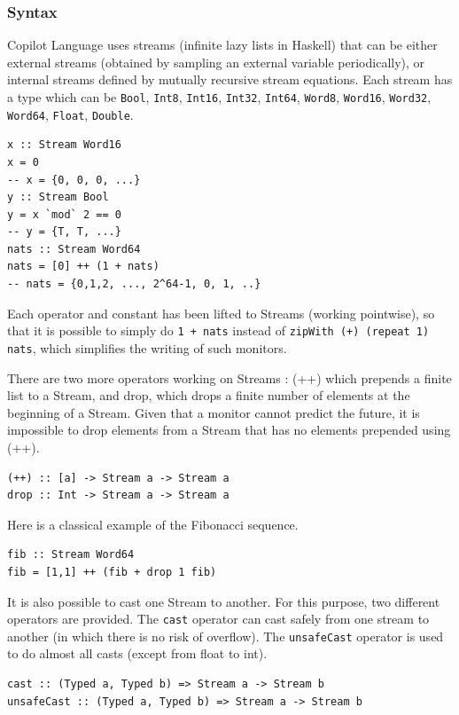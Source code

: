 \documentclass[a4paper,11pt,final]{article}
\begin{document}
	\subsubsection{Syntax}
	Copilot Language uses streams (infinite lazy lists in Haskell) that can be either external streams (obtained by sampling an external variable periodically), or internal streams defined by mutually recursive stream equations. Each stream has a type which can be \texttt{Bool}, \texttt{Int8}, \texttt{Int16}, \texttt{Int32}, \texttt{Int64}, \texttt{Word8}, \texttt{Word16}, \texttt{Word32}, \texttt{Word64}, \texttt{Float}, \texttt{Double}.
	
\begin{verbatim}
x :: Stream Word16
x = 0
-- x = {0, 0, 0, ...}
y :: Stream Bool
y = x `mod` 2 == 0
-- y = {T, T, ...}
nats :: Stream Word64
nats = [0] ++ (1 + nats)
-- nats = {0,1,2, ..., 2^64-1, 0, 1, ..}  
\end{verbatim}
	
	Each operator and constant has been lifted to Streams (working pointwise), so that it is possible to simply do \texttt{1 + nats} instead of \texttt{zipWith (+) (repeat 1) nats}, which simplifies the writing of such monitors. 
	
	There are two more operators working on Streams : (++) which prepends a finite list to a Stream, and drop, which drops a finite number of elements at the beginning of a Stream. Given that a monitor cannot predict the future, it is impossible to drop elements from a Stream that has no elements prepended using (++).
	
\begin{verbatim}
(++) :: [a] -> Stream a -> Stream a
drop :: Int -> Stream a -> Stream a  
\end{verbatim}
	
	Here is a classical example of the Fibonacci sequence.
	
\begin{verbatim}
fib :: Stream Word64
fib = [1,1] ++ (fib + drop 1 fib)  
\end{verbatim}
	
	It is also possible to cast one Stream to another. For this purpose, two different operators are provided. The \texttt{cast} operator can cast safely from one stream to another (in which there is no risk of overflow). The \texttt{unsafeCast} operator is used to do almost all casts (except from float to int).
\begin{verbatim}
cast :: (Typed a, Typed b) => Stream a -> Stream b
unsafeCast :: (Typed a, Typed b) => Stream a -> Stream b
\end{verbatim}
	
\end{document}
